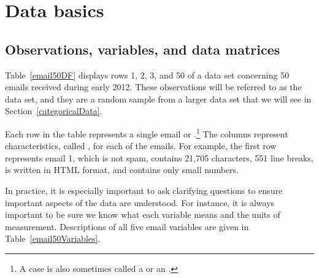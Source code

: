 \section[Data basics]{Data basics }
\label{dataBasics}

\subsection{Observations, variables, and data matrices}


Table~\ref{email50DF} displays rows 1, 2, 3, and 50 of a data set concerning 50 emails received during early 2012. These observations will be referred to as the  data set, and they are a random sample from a larger data set that we will see in Section~\ref{categoricalData}.

Each row in the table represents a single email or .\footnote{A case is also sometimes called a  or an .} The columns represent characteristics, called , for each of the emails. For example, the first row represents email 1, which is not spam, contains 21,705 characters, 551 line breaks, is written in HTML format, and contains only small numbers.

In practice, it is especially important to ask clarifying questions to ensure important aspects of the data are understood. For instance, it is always important to be sure we know what each variable means and the units of measurement. Descriptions of all five email variables are given in Table~\ref{email50Variables}.

